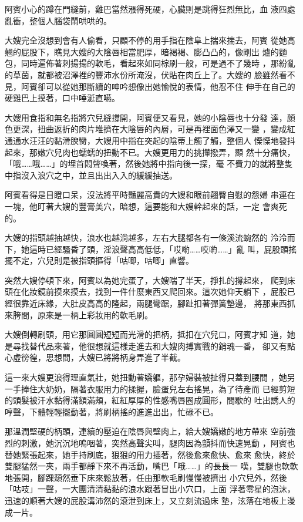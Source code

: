 阿賓小心的蹲在門縫前，雞巴當然漲得死硬，心臟則是跳得狂烈無比，血
液四處亂衝，整個人腦袋鬧哄哄的。

大嫂完全沒想到會有人偷看，只顧不停的用手指在陰阜上揣來揣去，阿賓
從她高翹的屁股下，瞧見大嫂的大陰唇相當肥厚，暗褐褐、膨凸凸的，像剛出
爐的麵包，同時遍佈著刺揚揚的軟毛，看起來如同棕刷一般，可是過不了幾時
，那紛亂的草茵，就都被沼澤裡的豐沛水份所淹沒，伏貼在肉丘上了。大嫂的
臉雖然看不見，阿賓卻可以從她那斷續的呻吟想像出她愉悅的表情，他忍不住
伸手在自己的硬雞巴上摸著，口中唾涎直嚥。

大嫂用食指和無名指將穴兒縫撐開，阿賓便又看見，她的小陰唇也十分發
達，顏色更深，扭曲返折的肉片堆擠在大陰唇的內層，可是再裡面色澤又一變
，變成紅通通水汪汪的黏滑腴臠，大嫂用中指在突起的陰蒂上觸了觸，整個人
慄慄地發抖起來，那嫩穴兒肉也蠕蠕的扭動不已。大嫂更用力的挑攆撥弄，顯
然十分痛快，「哦……哦……」的埋首悶聲喚著，然後她將中指向後一探，毫
不費力的就將整隻中指沒入浪穴之中，並且出出入入的緩緩抽送。

阿賓看得是目瞪口呆，沒法將平時豔麗高貴的大嫂和眼前翹臀自慰的怨婦
串連在一塊，他盯著大嫂的豐膏美穴，暗想，這要能和大嫂幹起來的話，一定
會爽死的。

大嫂的指頭越抽越快，浪水也越淌越多，左右大腿都各有一條溪流蜿然的
泠泠而下，她這時已經騷昏了頭，淫浪聲高高低低，「哎喲……哎喲……」亂
叫，屁股頭搖擺不定，穴兒則是被指頭摳得「咕唧，咕唧」直響。

突然大嫂停頓下來，阿賓以為她完蛋了，大嫂喘了半天，掙扎的撐起來，
爬到床頭在化妝鏡前摸來摸去，找到一件什麼東西又爬回來。這次她仰天躺下
，屁股已經很靠近床緣，大肚皮高高的隆起，兩腿彎踞，腳趾扣著彈簧墊邊，
將那東西抓來胯間，原來是一柄上彩妝用的軟毛刷。

大嫂倒轉刷頭，用它那圓圓短短而光滑的把柄，抵扣在穴兒口，阿賓才知
道，她是尋找替代品來著，他很想就這樣走進去和大嫂肉搏實戰的銷魂一番，
卻又有點心虛徬徨，思想間，大嫂已將將柄身弄進了半截。

這一來大嫂更浪得理直氣壯，她扭動著嬌軀，那孕婦裝被扯得只蓋到腰間
，她另一手捧住大奶奶，隔著衣服用力的揉握，臉蛋兒左右搖晃，為了待產而
已經剪短的頭髮被汗水黏得滿額滿頰，紅紅厚厚的性感嘴唇圈成圓形，間歇的
吐出誘人的哼聲，下體輕輕擺動著，將刷柄搖的進進出出，忙碌不已。

那溫潤堅硬的柄頭，連續的壓迫在陰唇與壁肉上，給大嫂嬌嫩的地方帶來
空前強烈的刺激，她沉沉地嗚咽著，突然高聲尖叫，腿肉因為顫抖而快速晃動
，阿賓也替她緊張起來，她手持刷底，狠狠的用力插著，然後愈來愈快、愈來
愈快，終於雙腿猛然一夾，兩手都靜下來不再活動，嘴巴「哦……」的長長一
嘆，雙腿也軟軟地張開，腳踝頹然垂下床來鬆放著，任由那軟毛刷慢慢被擠出
小穴兒外，然後「咕吱」一聲，一大團清清黏黏的浪水跟著冒出小穴口，上面
浮著零星的泡沫，迅速的順著大嫂的屁股溝沛然的滾泄到床上，又立刻流過床
墊，泫落在地板上漫成一片。

